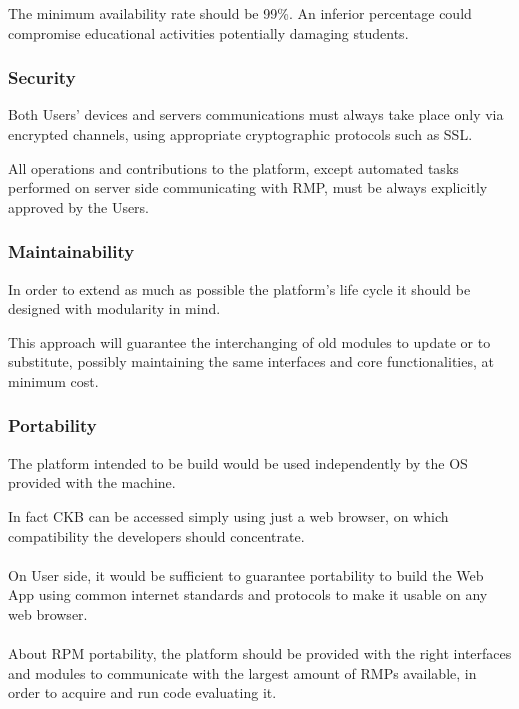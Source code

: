 The minimum availability rate should be 99\%. An inferior percentage could compromise educational activities potentially damaging students.

\subsubsection{Security}
Both Users' devices and servers communications must always take place only via encrypted channels, using appropriate cryptographic protocols such as SSL. 

All operations and contributions to the platform, except automated tasks performed on server side communicating with RMP, must be always explicitly approved by the Users.

\subsubsection{Maintainability}
In order to extend as much as possible the platform's life cycle it should be designed with modularity in mind. 

This approach will guarantee the interchanging of old modules to update or to substitute, possibly maintaining the same interfaces and core functionalities, at minimum cost.

\subsubsection{Portability}
The platform intended to be build would be used independently by the OS provided with the machine. 

In fact CKB can be accessed simply using just a web browser, on which compatibility the developers should concentrate.\\ 
\\
On User side, it would be sufficient to guarantee portability to build the Web App using common internet standards and protocols to make it usable on any web browser.\\
\\
About RPM portability, the platform should be provided with the right interfaces and modules to communicate with the largest amount of RMPs available, in order to acquire and run code evaluating it.